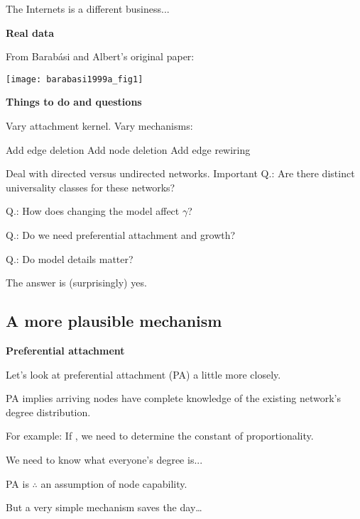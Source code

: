 \begin{frame}[label=]
\begin{frame}[label=]
\begin{frame}[label=]
\begin{frame}[label=]
\begin{frame}[label=]
\begin{frame}[label=]
\begin{frame}[label=]
\begin{frame}[label=]
\begin{frame}[label=]
\begin{frame}[label=]
\begin{frame}[label=]
\begin{frame}[label=]
\begin{frame}[label=]
  {
    The Internet\alert{s} is a different business...
  }


\begin{frame}[label=]
 \textbf{Real data}  

 From Barab\'{a}si and Albert's original paper\cite{barabasi1999a}:

 \texttt{[image: barabasi1999a\_fig1]}
 

\begin{frame}[label=]
 \textbf{Things to do and questions}  

 
  Vary attachment kernel.
  Vary mechanisms:
   
    Add edge deletion
    Add node deletion
    Add edge rewiring
   
  Deal with directed versus undirected networks.
  \alert{Important Q.}:
   Are there distinct universality classes for these networks?  
 
   \alert{Q.}:
   How does changing the model affect $\gamma$?
 
   \alert{Q.}:
   Do we need preferential attachment and growth?
 
   \alert{Q.}:
   Do model details matter?
 
   The answer is (surprisingly) \alert{yes}.
 


\subsection{A more plausible mechanism}

\begin{frame}[label=]
 \textbf{Preferential attachment}  
 
 
  
   Let's look at preferential attachment \alert{(PA)}
   a little more closely.
  
   PA implies arriving nodes have \alert{complete knowledge}
   of the existing network's degree distribution.
 
   For example: If , we need to determine
   the constant of proportionality.
 
   We need to know what everyone's degree is...
 
   PA is $\therefore$ an  assumption of
   node capability.
 
   But a \alert{very simple mechanism} saves the day\ldots
 



\end{frame}
\end{frame}
\end{frame}
\end{frame}
\end{frame}
\end{frame}
\end{frame}
\end{frame}
\end{frame}
\end{frame}
\end{frame}
\end{frame}
\end{frame}
\end{frame}
\end{frame}
\end{frame}
